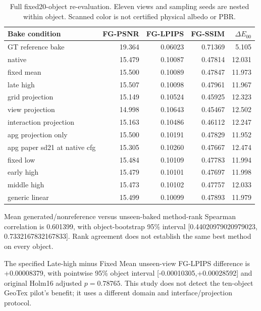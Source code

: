 \documentclass[11pt]{article}
\begin{document}
\begin{table}[ht]\centering\scriptsize\begin{tabular}{lrrrr}\toprule Bake condition & FG-PSNR & FG-LPIPS & FG-SSIM & $\Delta E_{00}$ \\\midrule
GT reference bake & 19.364 & 0.06023 & 0.71369 & 5.105 \\
native & 15.479 & 0.10087 & 0.47814 & 12.031 \\
fixed mean & 15.500 & 0.10089 & 0.47847 & 11.973 \\
late high & 15.507 & 0.10098 & 0.47961 & 11.967 \\
grid projection & 15.149 & 0.10524 & 0.45925 & 12.323 \\
view projection & 14.998 & 0.10643 & 0.45467 & 12.502 \\
interaction projection & 15.163 & 0.10486 & 0.46112 & 12.247 \\
apg projection only & 15.500 & 0.10191 & 0.47829 & 11.952 \\
apg paper sd21 at native cfg & 15.305 & 0.10260 & 0.47667 & 12.474 \\
fixed low & 15.484 & 0.10109 & 0.47783 & 11.994 \\
early high & 15.479 & 0.10101 & 0.47697 & 11.998 \\
middle high & 15.473 & 0.10102 & 0.47757 & 12.033 \\
generic linear & 15.499 & 0.10099 & 0.47893 & 11.979 \\
\bottomrule\end{tabular}\caption{Full fixed20-object re-evaluation. Eleven views and sampling seeds are nested within object. Scanned color is not certified physical albedo or PBR.}\end{table}
Mean generated/nonreference versus unseen-baked method-rank Spearman correlation is 0.601399, with object-bootstrap 95\% interval [0.44020979020979023, 0.7332167832167833]. Rank agreement does not establish the same best method on every object.


The specified Late-high minus Fixed Mean unseen-view FG-LPIPS difference is +0.00008379, with pointwise 95\% object interval [-0.00010305,+0.00028592] and original Holm16 adjusted $p=0.78765$. This study does not detect the ten-object GeoTex pilot's benefit; it uses a different domain and interface/projection protocol.
\end{document}
